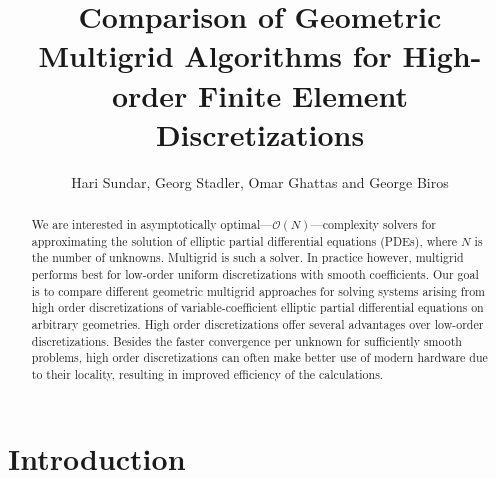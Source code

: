 \documentclass[smallcondensed,final]{svjour3}     %
\begin{document}

\title{Comparison of Geometric Multigrid Algorithms for High-order Finite Element Discretizations}

\author{Hari Sundar, Georg Stadler, Omar Ghattas and George Biros}


\maketitle

\begin{abstract}
We are interested in asymptotically
optimal---$\mathcal{O}(N)$---complexity solvers for approximating the
solution of elliptic partial differential equations (PDEs), where $N$
is the number of unknowns.  Multigrid is such a solver. In practice
however, multigrid performs best for low-order uniform discretizations
with smooth coefficients.
%
Our goal is to compare different geometric multigrid approaches for
solving systems arising from high order discretizations of
variable-coefficient elliptic partial differential equations on
arbitrary geometries. High order discretizations offer several
advantages over low-order discretizations. Besides the faster
convergence per unknown for sufficiently smooth problems, high order
discretizations can often make better use of modern hardware due to
their locality, resulting in improved efficiency of the calculations.
\end{abstract}




\section{Introduction}
\end{document}
